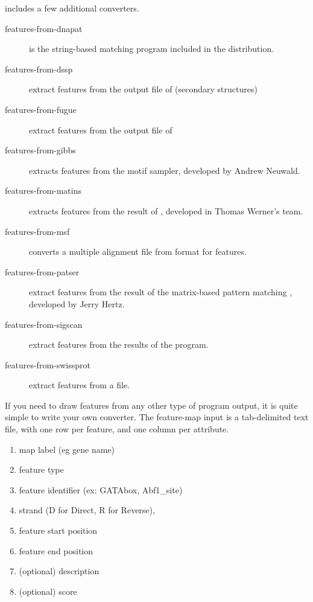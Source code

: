 \RSAT includes a few additional converters.

\begin{description}

\item[features-from-dnapat]  is the string-based 
matching program included in the  \RSAT distribution. 

\item[features-from-dssp] extract features from the output file of
 (secondary structures)

\item[features-from-fugue] extract features from the output file of

\item[features-from-gibbs] extracts features from the  
motif sampler, developed by Andrew Neuwald. 

\item[features-from-matins] extracts features from the result of 
, developed in Thomas Werner's team. 

\item[features-from-msf] converts a multiple alignment file from 
format  for features. 

\item[features-from-patser] extract features from the result of the 
matrix-based pattern matching , developed by Jerry Hertz. 

\item[features-from-sigscan] extract features from the results of the
 program. 

\item[features-from-swissprot] extract features from a  file. 

\end{description}


If you need to draw features from any other type of program 
output, it is quite simple to write your own converter. The feature-map 
input is a tab-delimited text file, with one row per feature, and 
one column per attribute. 

\begin{enumerate}
\item map label (eg gene name)
\item feature type
\item feature identifier (ex: GATAbox, Abf1\_site)
\item strand (D for Direct, R for Reverse),
\item feature start position
\item feature end position
\item (optional) description 
\item (optional) score
\end{enumerate}

